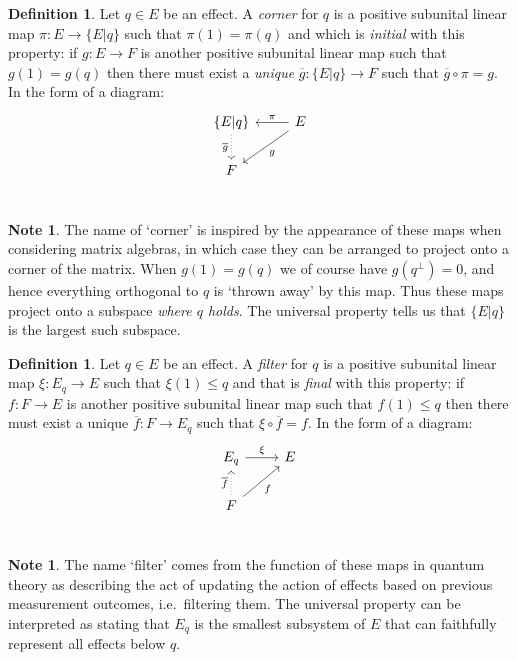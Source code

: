 \documentclass[submission,copyright,creativecommons]{eptcs}
\newcounter{main}
\theoremstyle{definition}
\newtheorem{definition}[main]{Definition}
\newtheorem{note}[main]{Note}
\newcommand{\cl}[1]{\overline{#1}}
\begin{document}
\begin{definition}
	Let $q\in E$ be an effect. A \emph{corner} for $q$ is a positive subunital linear map $\pi\colon E\rightarrow \{E\lvert q\}$ such that $\pi(1)=\pi(q)$ and which is \emph{initial} with this property: if $g\colon E\rightarrow F$ is another positive subunital linear map such that $g(1)=g(q)$ then there must exist a \emph{unique} $\cl{g}\colon\{E\lvert q\}\rightarrow F$ such that $\cl{g}\circ \pi = g$. In the form of a diagram:
    \[\begin{tikzcd}[ampersand replacement = \&]
    \{E\lvert q\} \arrow[dotted,swap]{d}{\cl{g}}\&\arrow[swap]{l}{\pi} E\arrow{dl}{g} \\
     F\&  \\
    \end{tikzcd}\]
\end{definition}
\begin{note}
The name of `corner' is inspired by the appearance of these maps
when considering matrix algebras, in which case they can be arranged to
    project onto
a corner of the matrix. When $g(1)=g(q)$ we of course have $g(q^\perp)=0$,
and hence everything orthogonal to $q$ is `thrown away' by this map. 
    Thus these maps project onto a subspace \emph{where $q$ holds}.
The universal property tells us that $\{E\lvert q\}$ is the
largest such subspace.
\end{note}

\begin{definition}
	Let $q\in E$ be an effect. A \emph{filter} for $q$ is a positive subunital linear map $\xi\colon E_q\rightarrow E$ such that $\xi(1)\leq q$ and that is \emph{final} with this property: if $f\colon F\rightarrow E$ is another positive subunital linear map such that $f(1)\leq q$ then there must exist a unique $\cl{f}\colon F\rightarrow E_q$ such that $\xi\circ \cl{f} = f$. In the form of a diagram:
    \[\begin{tikzcd}[ampersand replacement = \&]
    E_q \arrow{r}{\xi}\& E \\
    F \arrow[dotted]{u}{\overline{f}}\arrow{ru}[swap]{f}\&  \\
    \end{tikzcd}\] 
\end{definition}
\begin{note}
    The name `filter' comes from the function of these maps in quantum theory as describing the act of updating the action of effects based on previous measurement outcomes, i.e.\ filtering them. The universal property can be interpreted as stating that $E_q$ is the smallest subsystem of $E$ that can faithfully represent all effects below $q$.
\end{note}
\end{document}
